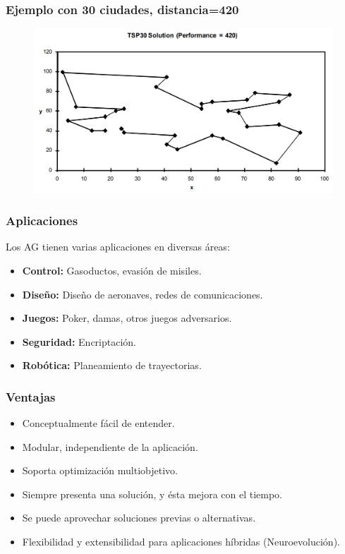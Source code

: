 \documentclass[10pt]{beamer}
\begin{document}
\begin{frame}
  \frametitle{Ejemplo con 30 ciudades, distancia=420}

  \begin{figure}[!h] 
    \centering
    \includegraphics[width=1\textwidth]{img/tsp5}
  \end{figure}

\end{frame}


\begin{frame}
  \frametitle{Aplicaciones}

  Los AG tienen varias aplicaciones en diversas áreas:
  \begin{itemize}
    \item \textbf{Control:} Gasoductos, evasión de misiles.
    \item \textbf{Diseño:} Diseño de aeronaves, redes de comunicaciones.
    \item \textbf{Juegos:} Poker, damas, otros juegos adversarios.
    \item \textbf{Seguridad:} Encriptación.
    \item \textbf{Robótica:} Planeamiento de trayectorias.
  \end{itemize}

\end{frame}

\begin{frame}
  \frametitle{Ventajas} 

  \begin{itemize}
    \item Conceptualmente fácil de entender.
    \item Modular, independiente de la aplicación.
    \item Soporta optimización multiobjetivo.
    \item Siempre presenta una solución, y ésta mejora con el tiempo.
    \item Se puede aprovechar soluciones previas o alternativas.
    \item Flexibilidad y extensibilidad para aplicaciones híbridas (Neuroevolución).
  \end{itemize}

\end{frame}
\end{document}
